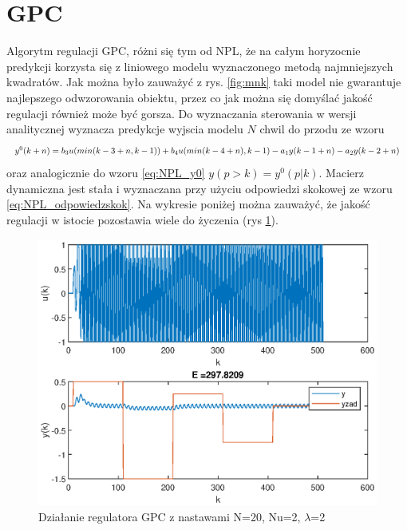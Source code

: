 		
	\section{GPC}
		\label{sec:GPC}
		Algorytm regulacji GPC, różni się tym od NPL, że na całym horyzocnie predykcji korzysta się z liniowego modelu wyznaczonego metodą najmniejszych kwadratów. Jak można było zauważyć z rys. \ref{fig:mnk} taki model nie gwarantuje najlepszego odwzorowania obiektu, przez co jak można się domyślać jakość regulacji również może być gorsza.
		Do wyznaczania sterowania w wersji analitycznej wyznacza predykcje wyjscia modelu $N$ chwil do przodu ze wzoru
		\begin{equation}
		\begin{tabular}{l}
		$y^0(k+n)=b_3u(min(k-3+n,k-1))+b_4u(min(k-4+n),k-1)-a_1y(k-1+n)-a_2y(k-2+n)$
		\end{tabular}
		\label{eq:GPC_y0}
		\end{equation}
		oraz analogicznie do wzoru \ref{eq:NPL_y0} $y(p>k)=y^0(p|k)$. Macierz dynamiczna jest stała i wyznaczana przy użyciu odpowiedzi skokowej ze wzoru \ref{eq:NPL_odpowiedzskok}. Na wykresie poniżej można zauważyć, że jakość regulacji w istocie pozostawia wiele do życzenia (rys \ref{fig:GPC}).
		
		\begin{figure}[h!]
			\centering
			\includegraphics[width=\linewidth]{img/GPC.eps}
			\caption{Działanie regulatora GPC z nastawami N=20, Nu=2, $\lambda$=2}
			\label{fig:GPC}
		\end{figure}
	
